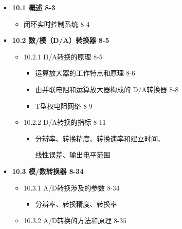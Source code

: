 \documentclass[zihao=5,linespread=1,heading=false,autoindent=0pt]{ctexart}
\newenvironment{citemize}%
{\begin{itemize}[parsep=0pt,itemsep=0pt,topsep=0pt,partopsep=0pt,labelwidth=1em,leftmargin=*]}
{\end{itemize}}
\theoremstyle{exampstyle} \newtheorem{definition}{定义}[section]
\theoremstyle{exampstyle} \newtheorem{example}{例}[section]
\theoremstyle{exampstyle} \newtheorem{theorem}{定理}[section]
\theoremstyle{exampstyle} \newtheorem{lemma}{引理}[section]
\theoremstyle{exampstyle} \newtheorem{myproof}{证明}[section]
\begin{document}
\begin{multicols*}{3}
    \begin{citemize}
    \item
      \textbf{10.1 概述 8-3}
    
      \begin{citemize}
       
      \item
        闭环实时控制系统 8-4
      \end{citemize}
    \item
      \textbf{10.2 数/模（D/A）转换器 8-5}
    
      \begin{citemize}
      \item
        10.2.1 D/A转换的原理 8-5
    
        \begin{citemize}
         
        \item
          运算放大器的工作特点和原理 8-6
        \item
          由并联电阻和运算放大器构成的 D/A转换器 8-8
        \item
          T型权电阻网络 8-9
        \end{citemize}
      \item
        10.2.2 D/A转换的指标 8-11
    
        \begin{citemize}
        \item
          分辨率、转换精度、转换速率和建立时间、
    
          线性误差、输出电平范围
        \end{citemize}
      \end{citemize}
    \item
      \textbf{10.3 模/数转换器 8-34}
    
      \begin{citemize}
       
      \item
        10.3.1 A/D转换涉及的参数 8-34
    
        \begin{citemize}
         
        \item
          分辨率、转换精度、转换率
        \end{citemize}
      \item
        10.3.2 A/D转换的方法和原理 8-35
    
        \begin{citemize}
         

\end{citemize}
\end{citemize}
\end{citemize}
\end{multicols*}
\end{document}
